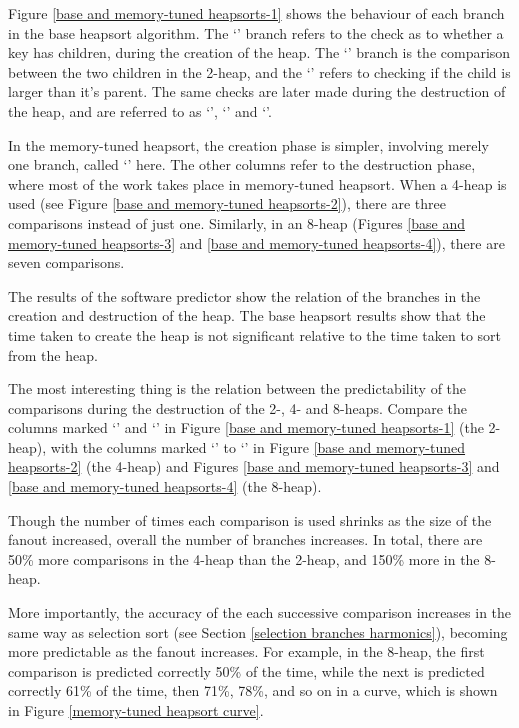 Figure \ref{base and memory-tuned heapsorts-1} shows the behaviour of each
branch in the base heapsort algorithm. The `' branch
refers to the check as to whether a key has children, during the creation of the
heap. The `' branch is the comparison between the
two children in the 2-heap, and the `' refers to
checking if the child is larger than it's parent. The same checks are later made
during the destruction of the heap, and are referred to as `', `' and `'.

In the memory-tuned heapsort, the creation phase is simpler, involving merely
one branch, called `' here. The other columns refer to the destruction
phase, where most of the work takes place in memory-tuned heapsort. When a
4-heap is used (see Figure \ref{base and memory-tuned heapsorts-2}), there are
three comparisons instead of just one. Similarly, in an 8-heap (Figures
\ref{base and memory-tuned heapsorts-3} and \ref{base and memory-tuned
heapsorts-4}), there are seven comparisons.

The results of the software predictor show the relation of the branches
in the creation and destruction of the heap. The base heapsort results show that
the time taken to create the heap is not significant relative to the time taken
to sort from the heap.

The most interesting thing is the relation between the predictability of the
comparisons during the destruction of the 2-, 4- and 8-heaps. Compare the
columns marked `' and `' in Figure \ref{base and memory-tuned heapsorts-1} (the 2-heap), with
the columns marked `' to `' in Figure
\ref{base and memory-tuned heapsorts-2} (the 4-heap) and Figures \ref{base and
memory-tuned heapsorts-3} and \ref{base and memory-tuned heapsorts-4} (the
8-heap).

Though the number of times each comparison is used shrinks as the size of the
fanout increased, overall the number of branches increases. In total, there are
50\% more comparisons in the 4-heap than the 2-heap, and 150\% more in the
8-heap.

More importantly, the accuracy of the each successive comparison increases in
the same way as selection sort (see Section \ref{selection branches harmonics}),
becoming more predictable as the fanout increases. For example, in the 8-heap,
the first comparison is predicted correctly 50\% of the time, while the next is
predicted correctly 61\% of the time, then 71\%, 78\%, and so on in a curve,
which is shown in Figure \ref{memory-tuned heapsort curve}.

